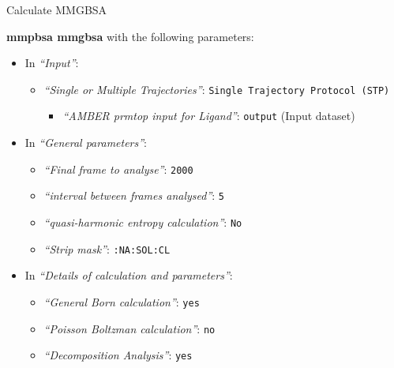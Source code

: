 \documentclass[twocolumn]{bmcart}%
\providecommand{\tightlist}{%
  \setlength{\itemsep}{0pt}\setlength{\parskip}{0pt}}
\begin{document}

\begin{handson_box_colour}{Calculate MMGBSA}

  \textbf{mmpbsa mmgbsa} with the following parameters:

  \begin{itemize}
  \tightlist
  \item
    In \emph{``Input''}:
    \begin{itemize}
    \tightlist
    \item
      \emph{``Single or Multiple Trajectories''}:
      \texttt{Single\ Trajectory\ Protocol\ (STP)}

      \begin{itemize}
      \tightlist
      \item
        \emph{``AMBER prmtop input for Ligand''}: \texttt{output} (Input
        dataset)
      \end{itemize}
    \end{itemize}
  \item
    In \emph{``General parameters''}:
    \begin{itemize}
    \tightlist
    \item      
      \emph{``Final frame to analyse''}: \texttt{2000}
    \item      
      \emph{``interval between frames analysed''}: \texttt{5}
    \item      
      \emph{``quasi-harmonic entropy calculation''}: \texttt{No}
    \item
      \emph{``Strip mask''}: \texttt{:NA:SOL:CL}
    \end{itemize}
  \item
    In \emph{``Details of calculation and parameters''}:
    \begin{itemize}
    \tightlist
    \item
      \emph{``General Born calculation''}: \texttt{yes}
    \item
      \emph{``Poisson Boltzman calculation''}: \texttt{no}
    \item
      \emph{``Decomposition Analysis''}: \texttt{yes}
    \end{itemize}
  \end{itemize}




\end{handson_box_colour}
\end{document}
